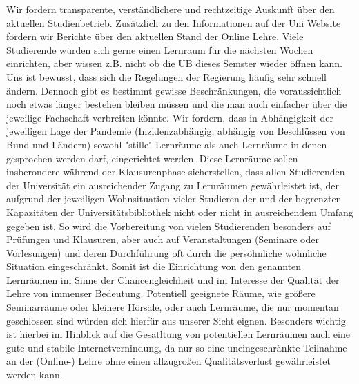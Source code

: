    {
        Wir fordern transparente, verständlichere und rechtzeitige Auskunft über den
        aktuellen
        Studienbetrieb. Zusätzlich zu den Informationen auf der Uni Website fordern wir
        Berichte über den
        aktuellen Stand der Online Lehre. Viele Studierende würden sich gerne einen Lernraum
        für die
        nächsten Wochen einrichten, aber wissen z.B. nicht ob die UB dieses Semster wieder
        öffnen kann.
        Uns ist bewusst, dass sich die Regelungen der Regierung häufig sehr schnell ändern.
        Dennoch gibt
        es bestimmt gewisse Beschränkungen, die voraussichtlich noch etwas länger bestehen
        bleiben
        müssen und die man auch einfacher über die jeweilige Fachschaft verbreiten könnte.
        Wir fordern, dass in Abhängigkeit der jeweiligen Lage der Pandemie (Inzidenzabhängig,
        abhängig
        von Beschlüssen von Bund und Ländern) sowohl "stille" Lernräume als auch Lernräume in
        denen
        gesprochen werden darf, eingerichtet werden. Diese Lernräume sollen insberondere
        während der
        Klausurenphase sicherstellen, dass allen Studierenden der Universität ein
        ausreichender Zugang zu 
        Lernräumen gewährleistet ist, der aufgrund der jeweiligen Wohnsituation vieler
        Studieren der und
        der begrenzten Kapazitäten der Universitätsbibliothek nicht oder nicht in
        ausreichendem Umfang
        gegeben ist. So wird die Vorbereitung von vielen Studierenden besonders auf Prüfungen
        und
        Klausuren, aber auch auf Veranstaltungen (Seminare oder Vorlesungen) und deren
        Durchführung oft
        durch die persöhnliche wohnliche Situation eingeschränkt. Somit ist die Einrichtung
        von den
        genannten Lernräumen im Sinne der Chancengleichheit und im Interesse der Qualität der
        Lehre von
        immenser Bedeutung. Potentiell geeignete Räume, wie größere Seminarräume oder
        kleinere
        Hörsäle, oder auch Lernräume, die nur momentan geschlossen sind würden sich hierfür
        aus unserer
        Sicht eignen. Besonders wichtig ist hierbei im Hinblick auf die Gesatltung von
        potentiellen
        Lernräumen auch eine gute und stabile Internetvernindung, da nur so eine
        uneingeschränkte
        Teilnahme an der (Online-) Lehre ohne einen allzugroßen Qualitätsverlust
        gewährleistet werden
        kann.
}
